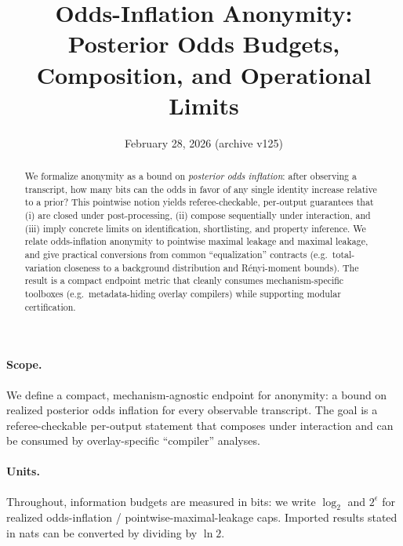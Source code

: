 \documentclass[11pt]{article}
\title{Odds-Inflation Anonymity:\\ Posterior Odds Budgets, Composition, and Operational Limits}
\author{}
\date{February 28, 2026 (archive v125)}
\theoremstyle{definition}
\theoremstyle{remark}
\begin{document}
\maketitle

\begin{abstract}
We formalize anonymity as a bound on \emph{posterior odds inflation}: after observing a transcript, how many bits can the odds in favor of any single identity increase relative to a prior?
This pointwise notion yields referee-checkable, per-output guarantees that (i) are closed under post-processing, (ii) compose sequentially under interaction, and (iii) imply concrete limits on identification, shortlisting, and property inference.
We relate odds-inflation anonymity to pointwise maximal leakage and maximal leakage, and give practical conversions from common ``equalization'' contracts (e.g.\ total-variation closeness to a background distribution and R\'enyi-moment bounds).
The result is a compact endpoint metric that cleanly consumes mechanism-specific toolboxes (e.g.\ metadata-hiding overlay compilers) while supporting modular certification.
\end{abstract}
\paragraph{Scope.}
We define a compact, mechanism-agnostic endpoint for anonymity: a bound on realized posterior odds inflation for every observable transcript.
The goal is a referee-checkable per-output statement that composes under interaction and can be consumed by overlay-specific ``compiler'' analyses.

\paragraph{Units.} Throughout, information budgets are measured in bits: we write $\log_2$ and $2^{\epsilon}$ for realized odds-inflation / pointwise-maximal-leakage caps. Imported results stated in nats can be converted by dividing by $\ln 2$.
\end{document}
